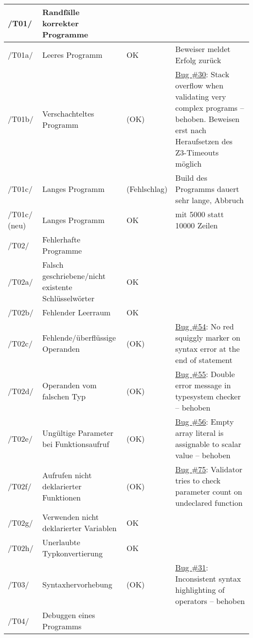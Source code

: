 \begin{landscape}
\begin{longtable}{lp{8cm}lp{10cm}}
/T01/ & Randfälle korrekter Programme &  &  \\ \midrule
/T01a/ & Leeres Programm & OK & Beweiser meldet Erfolg zurück \\ \midrule
/T01b/ & Verschachteltes Programm & (OK) & \href{https://github.com/team-worthwhile/worthwhile/issues/30}{\href{https://github.com/team-worthwhile/worthwhile/issues/30}{Bug \#30}}: Stack overflow when validating very complex programs – behoben. Beweisen erst nach Heraufsetzen des Z3-Timeouts möglich \\ \midrule
/T01c/ & Langes Programm & (Fehlschlag) & Build des Programms dauert sehr lange, Abbruch \\ \midrule
/T01c/ (neu) & Langes Programm & OK & mit 5000 statt 10000 Zeilen \\ \midrule
\midrule
/T02/ & Fehlerhafte Programme &  &  \\ \midrule
/T02a/ & Falsch geschriebene/nicht existente Schlüsselwörter & OK &  \\ \midrule
/T02b/ & Fehlender Leerraum & OK &  \\ \midrule
/T02c/ & Fehlende/überflüssige Operanden & (OK) & \href{https://github.com/team-worthwhile/worthwhile/issues/54}{Bug \#54}: No red squiggly marker on syntax error at the end of statement \\ \midrule
/T02d/ & Operanden vom falschen Typ & (OK) & \href{https://github.com/team-worthwhile/worthwhile/issues/55}{Bug \#55}: Double error message in typesystem checker – behoben \\ \midrule
/T02e/ & Ungültige Parameter bei Funktionsaufruf & (OK) & \href{https://github.com/team-worthwhile/worthwhile/issues/56}{Bug \#56}: Empty array literal is assignable to scalar value – behoben \\ \midrule
/T02f/ & Aufrufen nicht deklarierter Funktionen & (OK) & \href{https://github.com/team-worthwhile/worthwhile/issues/75}{Bug \#75}: Validator tries to check parameter count on undeclared function \\ \midrule
/T02g/ & Verwenden nicht deklarierter Variablen & OK &  \\ \midrule
/T02h/ & Unerlaubte Typkonvertierung & OK &  \\ \midrule
\midrule
/T03/ & Syntaxhervorhebung & (OK) & \href{https://github.com/team-worthwhile/worthwhile/issues/31}{Bug \#31}: Inconsistent syntax highlighting of operators – behoben \\ \midrule
\midrule
/T04/ & Debuggen eines Programms &  &  \\ \midrule

\end{longtable}
\end{landscape}
